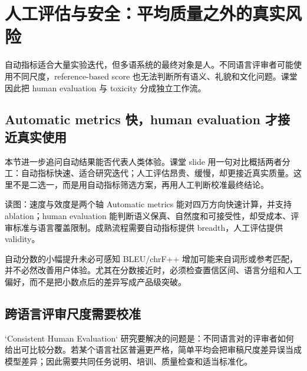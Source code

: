 \section{人工评估与安全：平均质量之外的真实风险}

自动指标适合大量实验迭代，但多语系统的最终对象是人。不同语言评审者可能使用不同尺度，reference-based score 也无法判断所有语义、礼貌和文化问题。课堂因此把 human evaluation 与 toxicity 分成独立工作流。

\subsection{Automatic metrics 快，human evaluation 才接近真实使用}

本节进一步追问自动结果能否代表人类体验。课堂 slide 用一句对比概括两者分工：自动指标快速、适合研究迭代；人工评估昂贵、缓慢，却更接近真实质量。这里不是二选一，而是用自动指标筛选方案，再用人工判断校准最终结论。


\begin{knowledgebox}{读图：速度与效度是两个轴}
Automatic metrics 能对四万方向快速计算，并支持 ablation；human evaluation 能判断语义保真、自然度和可接受性，却受成本、评审标准与语言覆盖限制。成熟流程需要自动指标提供 breadth，人工评估提供 validity。
\end{knowledgebox}

\begin{warningbox}{自动分数的小幅提升未必可感知}
BLEU/chrF++ 增加可能来自词形或参考匹配，并不必然改善用户体验。尤其在分数接近时，必须检查置信区间、语言分组和人工偏好，而不是把小数点后的差异写成产品级突破。
\end{warningbox}


\subsection{跨语言评审尺度需要校准}

`Consistent Human Evaluation` 研究要解决的问题是：不同语言对的评审者如何给出可比较分数。若某个语言社区普遍更严格，简单平均会把审稿尺度差异误当成模型差异；因此需要共同任务说明、培训、质量检查和适当标准化。


